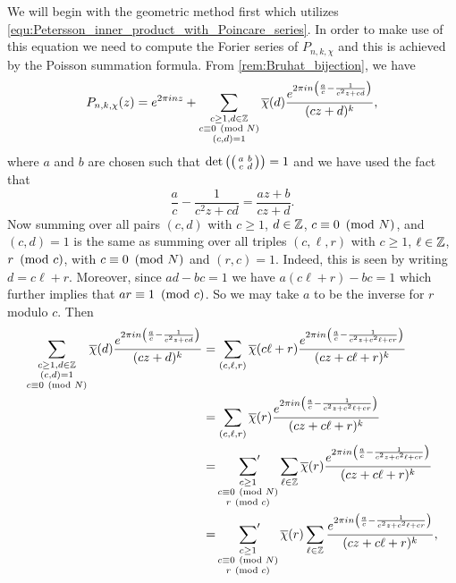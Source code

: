       We will begin with the geometric method first which utilizes \cref{equ:Petersson_inner_product_with_Poincare_series}. In order to make use of this equation we need to compute the Forier series of $P_{n,k,\chi}$ and this is achieved by the Poisson summation formula. From \cref{rem:Bruhat_bijection}, we have
      \[
        P_{n,k,\chi}(z) = e^{2\pi inz}+\sum_{\substack{c \ge 1, d \in \mathbb{Z} \\ c \equiv 0 \ \left(\text{mod }N\right) \\ (c,d) = 1}}\overline{\chi}(d)\frac{e^{2\pi in\left(\frac{a}{c}-\frac{1}{c^{2}z+cd}\right)}}{(cz+d)^{k}},
      \]
      where $a$ and $b$ are chosen such that $\det\left(\begin{psmallmatrix} a & b \\ c & d \end{psmallmatrix}\right) = 1$ and we have used the fact that
      \[
        \frac{a}{c}-\frac{1}{c^{2}z+cd} = \frac{az+b}{cz+d}.
      \]
      Now summing over all pairs $(c,d)$ with $c \ge 1$, $d \in \mathbb{Z}$, $c \equiv 0 \ \left(\text{mod }N\right)$, and $(c,d) = 1$ is the same as summing over all triples $(c,\ell,r)$ with $c \ge 1$, $\ell \in \mathbb{Z}$, $r \ \left(\text{mod }c\right)$, with $c \equiv 0 \ \left(\text{mod }N\right)$ and $(r,c) = 1$. Indeed, this is seen by writing $d = c\ell+r$. Moreover, since $ad-bc = 1$ we have $a(c\ell+r)-bc = 1$ which further implies that $ar \equiv 1 \ \left(\text{mod }c\right)$. So we may take $a$ to be the inverse for $r$ modulo $c$. Then
      \begin{align*}
        \sum_{\substack{c \ge 1,d \in \mathbb{Z} \\ (c,d) = 1 \\ c \equiv 0 \ \left(\text{mod }N\right)}}\overline{\chi}(d)\frac{e^{2\pi in\left(\frac{a}{c}-\frac{1}{c^{2}z+cd}\right)}}{(cz+d)^{k}} &= \sum_{(c,\ell,r)}\overline{\chi}(c\ell+r)\frac{e^{2\pi in\left(\frac{a}{c}-\frac{1}{c^{2}z+c^{2}\ell+cr}\right)}}{(cz+c\ell+r)^{k}} \\
        &= \sum_{(c,\ell,r)}\overline{\chi}(r)\frac{e^{2\pi in\left(\frac{a}{c}-\frac{1}{c^{2}z+c^{2}\ell+cr}\right)}}{(cz+c\ell+r)^{k}} \\
        &= \sideset{}{'}\sum_{\substack{c \ge 1 \\ c \equiv 0 \ \left(\text{mod }N\right) \\ r \ \left(\text{mod }c\right)}}\sum_{\ell \in \mathbb{Z}}\overline{\chi}(r)\frac{e^{2\pi in\left(\frac{a}{c}-\frac{1}{c^{2}z+c^{2}\ell+cr}\right)}}{(cz+c\ell+r)^{k}} \\
        &= \sideset{}{'}\sum_{\substack{c \ge 1 \\ c \equiv 0 \ \left(\text{mod }N\right) \\ r \ \left(\text{mod }c\right)}}\overline{\chi}(r)\sum_{\ell \in \mathbb{Z}}\frac{e^{2\pi in\left(\frac{a}{c}-\frac{1}{c^{2}z+c^{2}\ell+cr}\right)}}{(cz+c\ell+r)^{k}}, 
      \end{align*}
